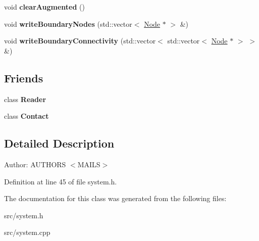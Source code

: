 \begin{CompactItemize}
\item 
\hypertarget{classmknix_1_1System_fbf67e600535664daa11f57170ce28b1}{
void \textbf{clearAugmented} ()}
\label{classmknix_1_1System_fbf67e600535664daa11f57170ce28b1}

\item 
\hypertarget{classmknix_1_1System_7569699ef2cda26032879de3ea96b2e6}{
void \textbf{writeBoundaryNodes} (std::vector$<$ \hyperlink{classmknix_1_1Node}{Node} $\ast$ $>$ \&)}
\label{classmknix_1_1System_7569699ef2cda26032879de3ea96b2e6}

\item 
\hypertarget{classmknix_1_1System_8636993e61acc2af30b0cab7e79d8c01}{
void \textbf{writeBoundaryConnectivity} (std::vector$<$ std::vector$<$ \hyperlink{classmknix_1_1Node}{Node} $\ast$ $>$ $>$ \&)}
\label{classmknix_1_1System_8636993e61acc2af30b0cab7e79d8c01}

\end{CompactItemize}
\subsection*{Friends}
\begin{CompactItemize}
\item 
\hypertarget{classmknix_1_1System_35cb182752752c74a30050705acc3c06}{
class \textbf{Reader}}
\label{classmknix_1_1System_35cb182752752c74a30050705acc3c06}

\item 
\hypertarget{classmknix_1_1System_76d4b1c8c6040df20040808941b7e764}{
class \textbf{Contact}}
\label{classmknix_1_1System_76d4b1c8c6040df20040808941b7e764}

\end{CompactItemize}


\subsection{Detailed Description}
\begin{Desc}
\item[Author:]AUTHORS $<$MAILS$>$ \end{Desc}


Definition at line 45 of file system.h.

The documentation for this class was generated from the following files:\begin{CompactItemize}
\item 
src/system.h\item 
src/system.cpp\end{CompactItemize}
